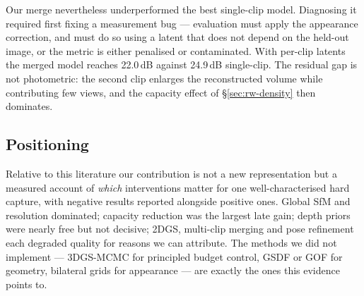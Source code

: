 Our merge nevertheless underperformed the best single-clip model. Diagnosing it
required first fixing a measurement bug — evaluation must apply the appearance
correction, and must do so using a latent that does not depend on the held-out
image, or the metric is either penalised or contaminated. With per-clip latents the
merged model reaches 22.0\,dB against 24.9\,dB single-clip. The residual gap is not
photometric: the second clip enlarges the reconstructed volume while contributing
few views, and the capacity effect of \S\ref{sec:rw-density} then dominates.

\subsection{Positioning}

Relative to this literature our contribution is not a new representation but a
measured account of \emph{which} interventions matter for one well-characterised
hard capture, with negative results reported alongside positive ones. Global SfM
and resolution dominated; capacity reduction was the largest late gain; depth
priors were nearly free but not decisive; 2DGS, multi-clip merging and pose
refinement each degraded quality for reasons we can attribute. The methods we did
not implement — 3DGS-MCMC for principled budget control, GSDF or GOF for geometry,
bilateral grids for appearance — are exactly the ones this evidence points to.

